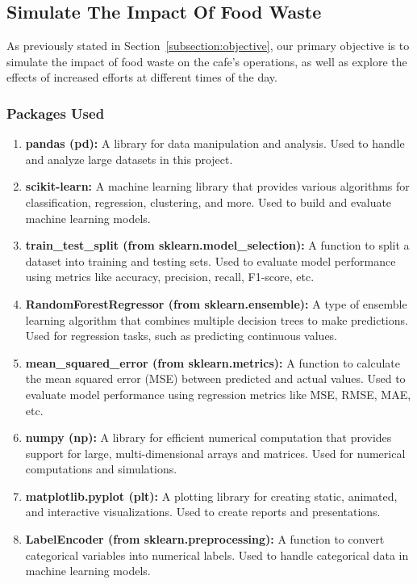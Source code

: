 \subsection{ Simulate The Impact Of Food Waste }

As previously stated in Section~\ref{subsection:objective}, our primary objective is to simulate the impact of food waste on the cafe's operations, as well as explore the effects of increased efforts at different times of the day.

\subsubsection{Packages Used}

\begin{enumerate}
	\item \textbf{pandas (pd):} A library for data manipulation and analysis. Used to handle and analyze large datasets in this project.
	\item \textbf{scikit-learn:} A machine learning library that provides various algorithms for classification, regression, clustering, and more. Used to build and evaluate machine learning models.
	\item \textbf{train\_test\_split (from sklearn.model\_selection):} A function to split a dataset into training and testing sets. Used to evaluate model performance using metrics like accuracy, precision, recall, F1-score, etc.
	\item \textbf{RandomForestRegressor (from sklearn.ensemble):} A type of ensemble learning algorithm that combines multiple decision trees to make predictions. Used for regression tasks, such as predicting continuous values.
	\item \textbf{mean\_squared\_error (from sklearn.metrics):} A function to calculate the mean squared error (MSE) between predicted and actual values. Used to evaluate model performance using regression metrics like MSE, RMSE, MAE, etc.
	\item \textbf{numpy (np):} A library for efficient numerical computation that provides support for large, multi-dimensional arrays and matrices. Used for numerical computations and simulations.
	\item \textbf{matplotlib.pyplot (plt):} A plotting library for creating static, animated, and interactive visualizations. Used to create reports and presentations.
	\item \textbf{LabelEncoder (from sklearn.preprocessing):} A function to convert categorical variables into numerical labels. Used to handle categorical data in machine learning models.
\end{enumerate}

